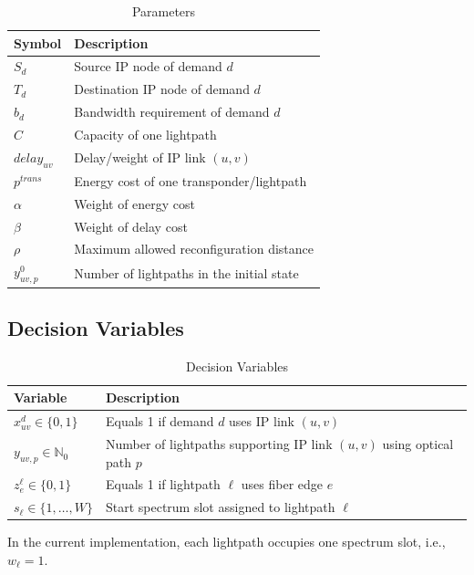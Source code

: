 \documentclass[journal,10pt]{IEEEtran}
\begin{document}
\begin{table}[t]
\caption{Parameters}
\label{tab:parameters}
\centering
\begin{tabularx}{\columnwidth}{L{0.24\columnwidth}Y}
\toprule
\textbf{Symbol} & \textbf{Description} \\
\midrule
$S_d$ & Source IP node of demand $d$ \\
$T_d$ & Destination IP node of demand $d$ \\
$b_d$ & Bandwidth requirement of demand $d$ \\
$C$ & Capacity of one lightpath \\
$delay_{uv}$ & Delay/weight of IP link $(u,v)$ \\
$p^{trans}$ & Energy cost of one transponder/lightpath \\
$\alpha$ & Weight of energy cost \\
$\beta$ & Weight of delay cost \\
$\rho$ & Maximum allowed reconfiguration distance \\
$y^{0}_{uv,p}$ & Number of lightpaths in the initial state \\
\bottomrule
\end{tabularx}
\end{table}

\subsection{Decision Variables}

\begin{table}[t]
\caption{Decision Variables}
\label{tab:variables}
\centering
\begin{tabularx}{\columnwidth}{L{0.30\columnwidth}Y}
\toprule
\textbf{Variable} & \textbf{Description} \\
\midrule
$x^{d}_{uv}\in\{0,1\}$ & Equals 1 if demand $d$ uses IP link $(u,v)$ \\
$y_{uv,p}\in\mathbb{N}_{0}$ & Number of lightpaths supporting IP link $(u,v)$ using optical path $p$ \\
$z^{\ell}_{e}\in\{0,1\}$ & Equals 1 if lightpath $\ell$ uses fiber edge $e$ \\
$s_{\ell}\in\{1,\ldots,W\}$ & Start spectrum slot assigned to lightpath $\ell$ \\
\bottomrule
\end{tabularx}
\end{table}

In the current implementation, each lightpath occupies one spectrum slot, i.e., $w_{\ell}=1$.
\end{document}

